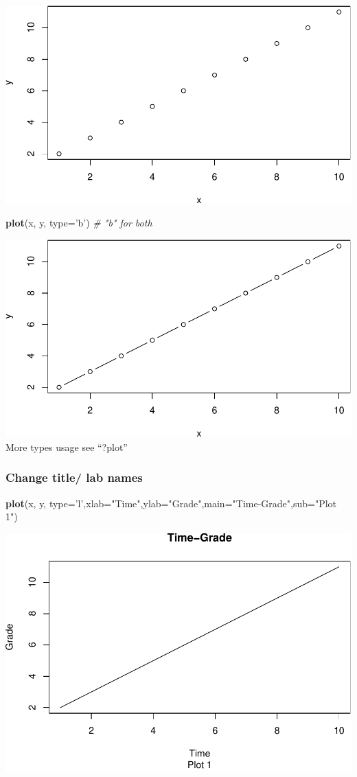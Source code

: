 \documentclass[]{article}
\newenvironment{Shaded}{\begin{snugshade}}{\end{snugshade}}
\newcommand{\CommentTok}[1]{\textcolor[rgb]{0.56,0.35,0.01}{\textit{#1}}}
\newcommand{\DataTypeTok}[1]{\textcolor[rgb]{0.13,0.29,0.53}{#1}}
\newcommand{\KeywordTok}[1]{\textcolor[rgb]{0.13,0.29,0.53}{\textbf{#1}}}
\newcommand{\NormalTok}[1]{#1}
\newcommand{\StringTok}[1]{\textcolor[rgb]{0.31,0.60,0.02}{#1}}
\begin{document}
\includegraphics[width=0.5\linewidth]{tutorial_files/figure-latex/unnamed-chunk-36-2}

\begin{Shaded}
\begin{Highlighting}[]
\KeywordTok{plot}\NormalTok{(x, y, }\DataTypeTok{type=}\StringTok{'b'}\NormalTok{) }\CommentTok{# "b" for both}
\end{Highlighting}
\end{Shaded}

\includegraphics[width=0.5\linewidth]{tutorial_files/figure-latex/unnamed-chunk-36-3}
More types usage see ``?plot''

\hypertarget{change-title-lab-names}{%
\subsubsection{Change title/ lab names}\label{change-title-lab-names}}

\begin{Shaded}
\begin{Highlighting}[]
\KeywordTok{plot}\NormalTok{(x, y, }\DataTypeTok{type=}\StringTok{'l'}\NormalTok{,}\DataTypeTok{xlab=}\StringTok{"Time"}\NormalTok{,}\DataTypeTok{ylab=}\StringTok{"Grade"}\NormalTok{,}\DataTypeTok{main=}\StringTok{"Time-Grade"}\NormalTok{,}\DataTypeTok{sub=}\StringTok{"Plot 1"}\NormalTok{)}
\end{Highlighting}
\end{Shaded}

\includegraphics[width=0.5\linewidth]{tutorial_files/figure-latex/unnamed-chunk-37-1}
\end{document}
